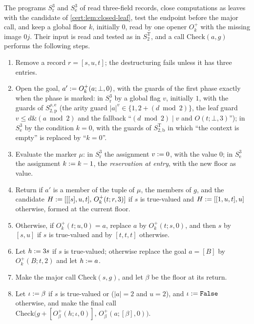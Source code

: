\begin{definition}\label{cert:def:floor-phase}
The programs $S^{3}_{\mathrm r}$ and $S^{3}_{\mathrm e}$ of  read
three-field records, close computations as leaves with the candidate of
\cref{cert:lem:closed-leaf}, test the endpoint before the major call, and keep a
global floor $k$, initially $0$, read by one opener $O^{+}_k$ with the missing image
$0j$. Their input is read and tested as in $S^{\mathrm T}_2$, and a call
$\mathrm{Check}(a,g)$ performs the following steps.
\begin{enumerate}[label=(F\arabic*)]
\item Remove a record $r=[s,u,t]$; the destructuring fails unless it has three
entries.
\item Open the goal, $a'\mathrel{:=} O^{+}_k(a;\bot,0)$, with the guards of the first phase
exactly when the phase is marked: in $S^{3}_{\mathrm r}$ by a global flag $v$,
initially $1$, with the guards of $S^{\rho,\mathrm e}_{2,\mathrm p}$ (the arity guard
$\lvert a\rvert^{v}\in\{1,2+(d\bmod 2)\}$, the leaf guard $v\le d\mathbin{\&}(a\bmod 2)$
and the fallback ``$(d\bmod 2)\mathbin{|}v$ and $O(t;\bot,3)$''); in
$S^{3}_{\mathrm e}$ by the condition $k=0$, with the guards of
$S^{\mathrm T}_{2,\mathrm b}$ in which ``the context is empty'' is replaced by
``$k=0$''.
\item Evaluate the marker $\mu$: in $S^{3}_{\mathrm r}$ the assignment $v\mathrel{:=} 0$,
with the value $0$; in $S^{3}_{\mathrm e}$ the assignment $k\mathrel{:=} k-1$, the
\emph{reservation at entry}, with the new floor as value.
\item Return if $a'$ is a member of the tuple of $\mu$, the members of $g$, and the
candidate $H\mathrel{:=}[[[s],u,t],\,O^{+}_k(t;r,3)]$ if $s$ is true-valued and
$H\mathrel{:=}[[1,u,t],u]$ otherwise, formed at the current floor.
\item Otherwise, if $O^{+}_k(t;u,0)=a$, replace $a$ by $O^{+}_k(t;s,0)$, and then $s$
by $[s,u]$ if $s$ is true-valued and by $[t,t,t]$ otherwise.
\item Let $h\mathrel{:=} 3s$ if $s$ is true-valued; otherwise replace the goal $a=[B]$ by
$O^{+}_k(B;t,2)$ and let $h\mathrel{:=} a$.
\item Make the major call $\mathrm{Check}(s,g)$, and let $\beta$ be the floor at its
return.
\item Let $\iota\mathrel{:=}\beta$ if $s$ is true-valued or ($\lvert a\rvert=2$ and $u=2$),
and $\iota\mathrel{:=}\texttt{False}$ otherwise, and make the final call
$\mathrm{Check}\bigl(g+[O^{+}_{\beta}(h;\iota,0)],\,O^{+}_{\beta}(a;[\beta],0)\bigr)$.

\end{enumerate}
\end{definition}
